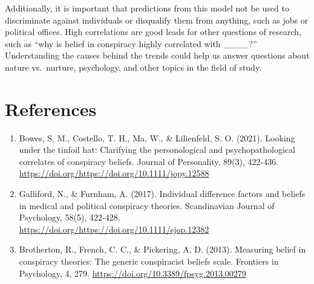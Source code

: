 \documentclass[11pt]{article}
\begin{document}
Additionally, it is important that predictions from this model not be
used to discriminate against individuals or disqualify them from
anything, such as jobs or political offices. High correlations are good
leads for other questions of research, such as ``why is belief in
conspiracy highly correlated with \_\_\_\_?'' Understanding the causes
behind the trends could help us answer questions about nature
vs.~nurture, psychology, and other topics in the field of study.

\newpage
\hypertarget{references}{%
\section*{References}\label{references}}
\begin{enumerate}
\item Bowes, S. M., Costello, T. H., Ma, W., \& Lilienfeld, S. O. (2021).
Looking under the tinfoil hat: Clarifying the personological and
psychopathological correlates of conspiracy beliefs. Journal of
Personality, 89(3), 422-436.
\newline\url{https://doi.org/https://doi.org/10.1111/jopy.12588}

\item Galliford, N., \& Furnham, A. (2017). Individual difference factors and beliefs in medical
and political conspiracy theories. Scandinavian Journal of Psychology,
58(5), 422-428. \newline\url{https://doi.org/https://doi.org/10.1111/sjop.12382}

\item Brotherton, R., French, C. C., \& Pickering, A. D. (2013). Measuring belief in conspiracy theories: The generic conspiracist beliefs scale. Frontiers in Psychology, 4, 279. \newline\url{https://doi.org/10.3389/fpsyg.2013.00279}

\end{enumerate}


    
    
    
\end{document}

